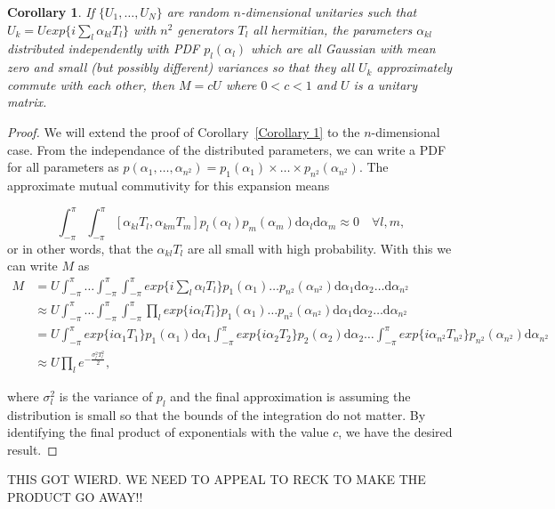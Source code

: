 \documentclass[aps,pra,twocolumn,superscriptaddress,numerical]{revtex4-1}
\newtheorem{corollary}{Corollary}
\begin{document}
\begin{corollary}
\label{Corollary 2}
If $\{U_1,\ldots,U_N\}$ are random $n$-dimensional unitaries such that $U_k = U exp\{i \sum_l \alpha_{kl} T_l\}$ with $n^2$ generators $T_l$ all hermitian, the parameters $\alpha_{kl}$ distributed independently with PDF $p_{l}(\alpha_l)$ which are all Gaussian with mean zero and small (but possibly different) variances so that they all $U_k$ approximately commute with each other, then $M = c U$ where $0 < c < 1$ and $U$ is a unitary matrix.
\end{corollary}
\begin{proof}
We will extend the proof of Corollary~\ref{Corollary 1} to the $n$-dimensional case.  From the independance of the distributed parameters, we can write a PDF for all parameters as $p(\alpha_1,\ldots,\alpha_{n^{2}}) = p_1(\alpha_1)\times\ldots\times p_{n^2}(\alpha_{n^{2}})$.  
The approximate mutual commutivity for this expansion means 
\begin{widetext}
\newcommand{\theint}{\int^\pi_{-\pi} \ldots \int^\pi_{-\pi} \int^\pi_{-\pi}}
\newcommand{\theintd}{\mathrm{d}\alpha_1 \mathrm{d}\alpha_2 \ldots \mathrm{d}\alpha_{n^{2}}}
\begin{equation}
	\int^\pi_{-\pi} \int^\pi_{-\pi}
	[\alpha_{kl}T_{l},\alpha_{km}T_{m}] p_l(\alpha_l)p_m(\alpha_m) \mathrm{d}\alpha_l \mathrm{d}\alpha_m \approx 0 \quad \forall l,m,
\end{equation}
or in other words, that the $\alpha_{kl}T_l$ are all small with high probability.  With this we can write $M$ as
\begin{align}
	M &= U \theint
	exp\{i \sum_l \alpha_{l} T_l\} p_1(\alpha_1)\ldots p_{n^2}(\alpha_{n^{2}})
	\theintd
	\label{eq:general integral form} \\
	&\approx U \theint
	\prod_{l}exp\{i \alpha_{l} T_l\}p_1(\alpha_1)\ldots p_{n^2}(\alpha_{n^{2}})
	\theintd  \\
	&= U\int^\pi_{-\pi} exp\{i \alpha_{1} T_1\}p_1(\alpha_1) \mathrm{d}\alpha_1 	\int^\pi_{-\pi} exp\{i \alpha_{2} T_2\}p_2(\alpha_2) \mathrm{d}\alpha_2 \ldots \int^\pi_{-\pi}
	exp\{i \alpha_{n^2} T_{n^2}\}p_{n^2}(\alpha_{n^2}) \mathrm{d}\alpha_{n^2} \\
	&\approx U \prod_l e^{-\frac{\sigma_l^2 T_l^2}{2}},
\end{align}
\end{widetext}
where $\sigma_l^2$ is the variance of $p_l$ and the final approximation is assuming the distribution is small so that the bounds of the integration do not matter.  By identifying the final product of exponentials with the value $c$, we have the desired result.
\end{proof}
THIS GOT WIERD.  WE NEED TO APPEAL TO RECK TO MAKE THE PRODUCT GO AWAY!!
\end{document}
